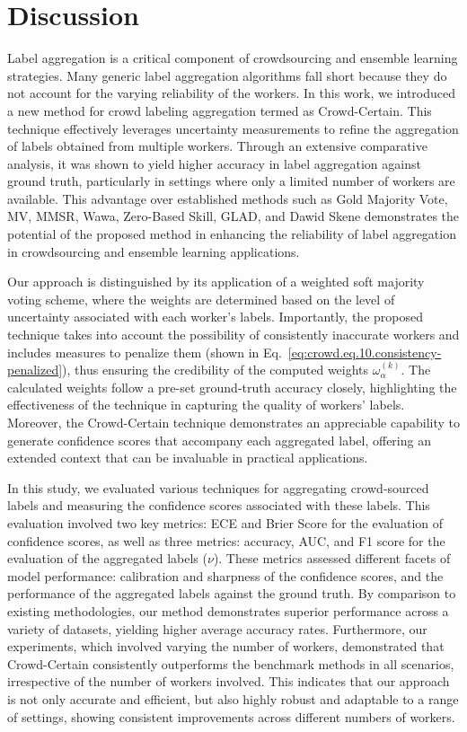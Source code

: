 \section{Discussion}\label{sec:crowd.discussion}
Label aggregation is a critical component of crowdsourcing and ensemble learning strategies. Many generic label aggregation algorithms fall short because they do not account for the varying reliability of the workers. In this work, we introduced a new method for crowd labeling aggregation termed as Crowd-Certain. This technique effectively leverages uncertainty measurements to refine the aggregation of labels obtained from multiple workers. Through an extensive comparative analysis, it was shown to yield higher accuracy in label aggregation against ground truth, particularly in settings where only a limited number of workers are available. This advantage over established methods such as Gold Majority Vote, MV, MMSR, Wawa, Zero-Based Skill, GLAD, and Dawid Skene demonstrates the potential of the proposed method in enhancing the reliability of label aggregation in crowdsourcing and ensemble learning applications.

Our approach is distinguished by its application of a weighted soft majority voting scheme, where the weights are determined based on the level of uncertainty associated with each worker's labels. Importantly, the proposed technique takes into account the possibility of consistently inaccurate workers and includes measures to penalize them (shown in Eq.~\ref{eq:crowd.eq.10.consistency-penalized}), thus ensuring the credibility of the computed weights $\omega_{\alpha}^{(k)}$. The calculated weights follow a pre-set ground-truth accuracy closely, highlighting the effectiveness of the technique in capturing the quality of workers' labels. Moreover, the Crowd-Certain technique demonstrates an appreciable capability to generate confidence scores that accompany each aggregated label, offering an extended context that can be invaluable in practical applications.

In this study, we evaluated various techniques for aggregating crowd-sourced labels and measuring the confidence scores associated with these labels. This evaluation involved two key metrics: ECE and Brier Score for the evaluation of confidence scores, as well as three metrics: accuracy, AUC, and F1 score for the evaluation of the aggregated labels ($\nu$). These metrics assessed different facets of model performance: calibration and sharpness of the confidence scores, and the performance of the aggregated labels against the ground truth. By comparison to existing methodologies, our method demonstrates superior performance across a variety of datasets, yielding higher average accuracy rates. Furthermore, our experiments, which involved varying the number of workers, demonstrated that Crowd-Certain consistently outperforms the benchmark methods in all scenarios, irrespective of the number of workers involved. This indicates that our approach is not only accurate and efficient, but also highly robust and adaptable to a range of settings, showing consistent improvements across different numbers of workers.

